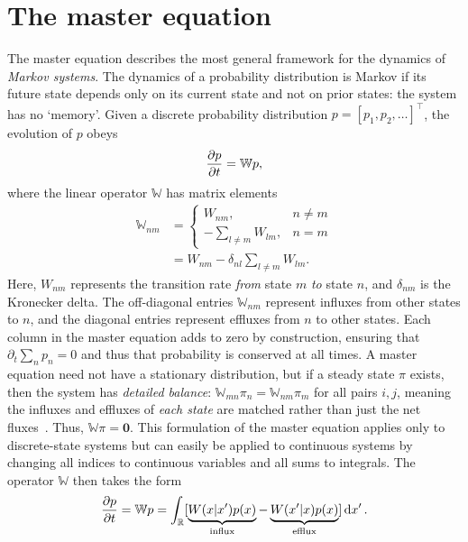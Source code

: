 \documentclass[hyperref={colorlinks=true, urlcolor=blue, citecolor=blue, final, bound}]{sfuthesis}
\begin{document}
\section{The master equation}
The master equation describes the most general framework for the dynamics of \textit{Markov systems}. The dynamics of a probability distribution is Markov if its future state depends only on its current state and not on prior states: the system has no `memory'. Given a discrete probability distribution $p = [p_1, p_2, \dots]^\intercal$, the evolution of $p$ obeys
\begin{equation}
    \pdv{p}{t} = \mathbb W p,
\end{equation}
where the linear operator $\mathbb W$ has matrix elements
\begin{align}
    \mathbb W_{nm} &= \begin{cases}
        W_{nm},& n\neq m\\
        -\sum_{l\neq m} W_{lm},& n = m
    \end{cases}\\
    &= W_{nm}-\delta_{nl}\sum_{l\neq m} W_{lm}.
\end{align}
Here, $W_{nm}$ represents the transition rate \textit{from} state $m$ \textit{to} state $n$, and $\delta_{nm}$ is the Kronecker delta. The off-diagonal entries $\mathbb W_{nm}$ represent influxes from other states to $n$, and the diagonal entries represent effluxes from $n$ to other states. Each column in the master equation adds to zero by construction, ensuring that $\partial_t\sum_n p_n = 0$ and thus that probability is conserved at all times. A master equation need not have a stationary distribution, but if a steady state $\pi$ exists, then the system has \textit{detailed balance}: $\mathbb W_{mn}\pi_n = \mathbb W_{nm}\pi_m$ for all pairs $i,j$, meaning the influxes and effluxes of \textit{each state} are matched rather than just the net fluxes~\cite{vanKampen2011}. Thus, $\mathbb W\pi=\mathbf 0$. This formulation of the master equation applies only to discrete-state systems but can easily be applied to continuous systems by changing all indices to continuous variables and all sums to integrals. The operator $\mathbb W$ then takes the form
\begin{equation}
    \pdv{p}{t} = \mathbb W p = \int_{\mathbb R} [\underbrace{W(x|x')p(x)}_{\mathrm{influx}}-\underbrace{W(x'|x)p(x)}_{\mathrm{efflux}}]\dd{x'}.\label{eq:continuousmaster}
\end{equation}
\end{document}
